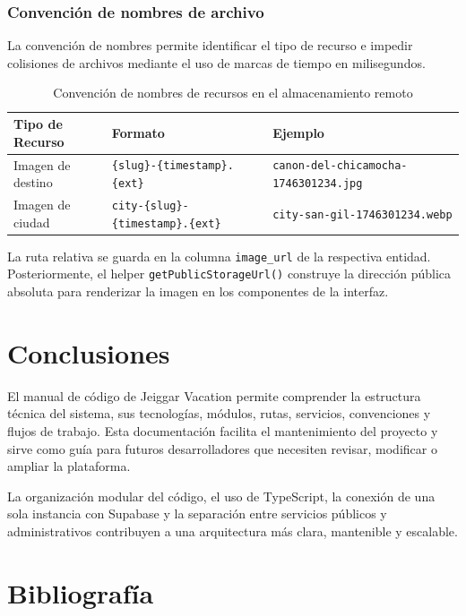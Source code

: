 \documentclass[12pt,letterpaper]{article}
\newcommand{\code}[1]{\nolinkurl{#1}}
\begin{document}
\subsubsection*{Convención de nombres de archivo}

La convención de nombres permite identificar el tipo de recurso e impedir colisiones de archivos mediante el uso de marcas de tiempo en milisegundos.

\begin{longtable}{|p{}|p{}|p{}|}
\caption{Convención de nombres de recursos en el almacenamiento remoto}\\
\hline
\textbf{Tipo de Recurso} & \textbf{Formato} & \textbf{Ejemplo} \\
\hline
Imagen de destino & \code{\{slug\}-\{timestamp\}.\{ext\}} & \code{canon-del-chicamocha-1746301234.jpg} \\
\hline
Imagen de ciudad & \code{city-\{slug\}-\{timestamp\}.\{ext\}} & \code{city-san-gil-1746301234.webp} \\
\hline
\end{longtable}

La ruta relativa se guarda en la columna \code{image\_url} de la respectiva entidad. Posteriormente, el helper \code{getPublicStorageUrl()} construye la dirección pública absoluta para renderizar la imagen en los componentes de la interfaz.

\section{Conclusiones}

El manual de código de Jeiggar Vacation permite comprender la estructura técnica del sistema, sus tecnologías, módulos, rutas, servicios, convenciones y flujos de trabajo. Esta documentación facilita el mantenimiento del proyecto y sirve como guía para futuros desarrolladores que necesiten revisar, modificar o ampliar la plataforma.

La organización modular del código, el uso de TypeScript, la conexión de una sola instancia con Supabase y la separación entre servicios públicos y administrativos contribuyen a una arquitectura más clara, mantenible y escalable.

\section*{Bibliografía}
\end{document}
